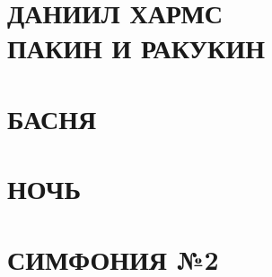 \documentclass[11pt,oneside]{book}
\begin{document}
\chapter*{ДАНИИЛ ХАРМС \\ ПАКИН И РАКУКИН}
\indent 


\chapter*{БАСНЯ} 
\indent 


\chapter*{НОЧЬ}
\indent


\chapter*{}
\indent 


\chapter*{СИМФОНИЯ №2} 
\indent

\end{document}
